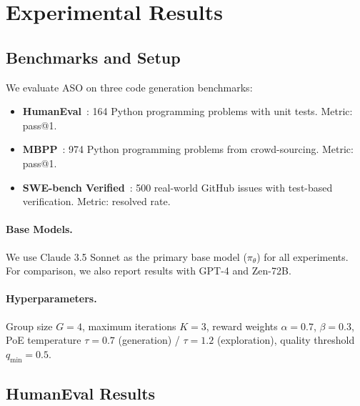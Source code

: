 \section{Experimental Results}

\label{sec:experiments}

\subsection{Benchmarks and Setup}

We evaluate ASO on three code generation benchmarks:

\begin{itemize}[leftmargin=1.5em]
    \item \textbf{HumanEval}~\cite{chen2021evaluating}: 164 Python programming
          problems with unit tests. Metric: pass@1.
    \item \textbf{MBPP}~\cite{austin2021program}: 974 Python programming
          problems from crowd-sourcing. Metric: pass@1.
    \item \textbf{SWE-bench Verified}~\cite{jimenez2024swebench}: 500
          real-world GitHub issues with test-based verification. Metric:
          resolved rate.
\end{itemize}

\paragraph{Base Models.}
We use Claude 3.5 Sonnet as the primary base model ($\pi_\theta$) for all
experiments. For comparison, we also report results with GPT-4 and Zen-72B.

\paragraph{Hyperparameters.}
Group size $G = 4$, maximum iterations $K = 3$, reward weights
$\alpha = 0.7$, $\beta = 0.3$, PoE temperature $\tau = 0.7$ (generation) /
$\tau = 1.2$ (exploration), quality threshold $q_{\min} = 0.5$.

\subsection{HumanEval Results}

